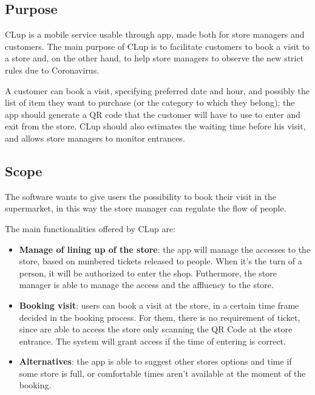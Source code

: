 \documentclass{article}
\begin{document}
	\subsection{Purpose}
	
	CLup is a mobile service usable through app, made both for store managers and customers. The main purpose of CLup is to facilitate customers to book a visit to a store and, on the other hand, to help store managers to observe the new strict rules due to Coronavirus.
	
	A customer can book a visit, specifying preferred date and hour, and possibly the list of item they want to purchase (or the category to which they belong); the app should generate a QR code that the customer will have to use to enter and exit from the store. CLup should also estimates the waiting time before his visit, and allows store managers to monitor entrances.
	
	\subsection{Scope}
	
	The software wants to give users the possibility to book their visit in the supermarket, in this way the store manager can regulate the flow of people.
	
	The main functionalities offered by CLup are:
	
	\begin{itemize}
		
		\item {\bfseries Manage of lining up of the store}: the app will manage the accesses to the store, based on numbered tickets released to people. When it's the turn of a person, it will be authorized to enter the shop. Futhermore, the store manager is able to manage the access and the affluency to the store.
		
		\item {\bfseries Booking visit}: users can book a visit at the store, in a certain time frame decided in the booking process. For them, there is no requirement of ticket, since are able to access the store only scanning the QR Code at the store entrance. The system will grant access if the time of entering is correct.
		
		\item {\bfseries Alternatives}: the app is able to suggest other stores options and time if some store is full, or comfortable times aren't available at the moment of the booking.
	
	\end{itemize}
\end{document}
